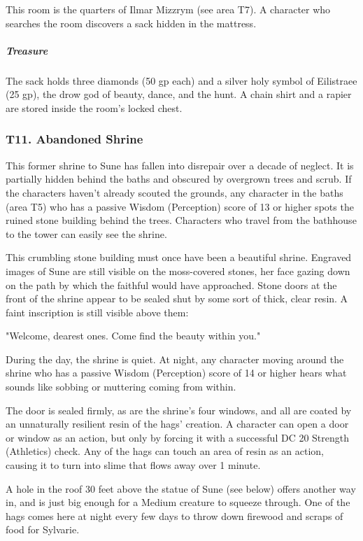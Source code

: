 \documentclass[10pt,a4paper,twoside,bg=print,twocolumn,openany,nodeprecatedcode]{dndbook}
\begin{document}
This room is the quarters of Ilmar Mizzrym (see area T7). A character who searches the room discovers a sack hidden in the mattress.

\subparagraph{Treasure}
The sack holds three diamonds (50 gp each) and a silver holy symbol of Eilistraee (25 gp), the drow god of beauty, dance, and the hunt. A chain shirt and a rapier are stored inside the room's locked chest.

\subsubsection{T11. Abandoned Shrine}
This former shrine to Sune has fallen into disrepair over a decade of neglect. It is partially hidden behind the baths and obscured by overgrown trees and scrub. If the characters haven't already scouted the grounds, any character in the baths (area T5) who has a passive Wisdom (Perception) score of 13 or higher spots the ruined stone building behind the trees. Characters who travel from the bathhouse to the tower can easily see the shrine.

\begin{DndReadAloud}{}
This crumbling stone building must once have been a beautiful shrine. Engraved images of Sune are still visible on the moss-covered stones, her face gazing down on the path by which the faithful would have approached. Stone doors at the front of the shrine appear to be sealed shut by some sort of thick, clear resin. A faint inscription is still visible above them:

"Welcome, dearest ones. Come find the beauty within you."

\end{DndReadAloud}

During the day, the shrine is quiet. At night, any character moving around the shrine who has a passive Wisdom (Perception) score of 14 or higher hears what sounds like sobbing or muttering coming from within.

The door is sealed firmly, as are the shrine's four windows, and all are coated by an unnaturally resilient resin of the hags' creation. A character can open a door or window as an action, but only by forcing it with a successful DC 20 Strength (Athletics) check. Any of the hags can touch an area of resin as an action, causing it to turn into slime that flows away over 1 minute.

A hole in the roof 30 feet above the statue of Sune (see below) offers another way in, and is just big enough for a Medium creature to squeeze through. One of the hags comes here at night every few days to throw down firewood and scraps of food for Sylvarie.
\end{document}

